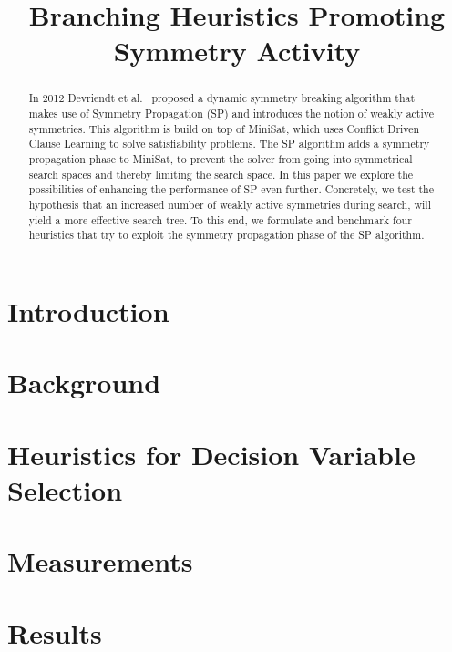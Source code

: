 

\title{Branching Heuristics Promoting Symmetry Activity}


	\maketitle

	\begin{abstract}
	In 2012 Devriendt et al.~\cite{devriendt2012symmetry} proposed a dynamic symmetry breaking algorithm
	that makes use of Symmetry Propagation (SP) and introduces the notion of weakly active symmetries.
	This algorithm is build on top of MiniSat,
	which uses Conflict Driven Clause Learning to solve satisfiability problems. The SP algorithm adds a symmetry propagation phase to MiniSat,
	to prevent the solver from going into symmetrical search spaces and thereby limiting the search space.
	In this paper we explore the possibilities of enhancing the performance of SP even further.
	Concretely, we test the hypothesis that an increased number of weakly active symmetries during
	search, will yield a more effective search tree.
	To this end, we formulate and benchmark four heuristics that try to exploit the
	symmetry propagation phase of the SP algorithm.
	\end{abstract}

	\section{Introduction}
		\label{sec:Introduction}
		

	\section{Background}
		\label{sec:Background}
		

	\section{Heuristics for Decision Variable Selection}
		\label{sec:DecisionVars}
		

	\section{Measurements}
		\label{sec:measurements}
		

	\section{Results}
		\label{sec:Results}
		

